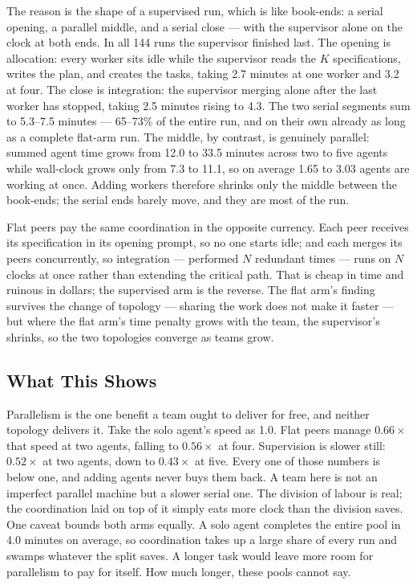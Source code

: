 \documentclass[11pt,a4paper]{article}
\begin{document}
The reason is the shape of a supervised run, which is like book-ends: a serial opening, a parallel middle, and a serial close --- with the supervisor alone on the clock at both ends. In all 144 runs the supervisor finished last. The opening is allocation: every worker sits idle while the supervisor reads the $K$ specifications, writes the plan, and creates the tasks, taking 2.7 minutes at one worker and 3.2 at four. The close is integration: the supervisor merging alone after the last worker has stopped, taking 2.5 minutes rising to 4.3. The two serial segments sum to 5.3--7.5 minutes --- 65--73\% of the entire run, and on their own already as long as a complete flat-arm run. The middle, by contrast, is genuinely parallel: summed agent time grows from 12.0 to 33.5 minutes across two to five agents while wall-clock grows only from 7.3 to 11.1, so on average 1.65 to 3.03 agents are working at once. Adding workers therefore shrinks only the middle between the book-ends; the serial ends barely move, and they are most of the run.

Flat peers pay the same coordination in the opposite currency. Each peer receives its specification in its opening prompt, so no one starts idle; and each merges its peers concurrently, so integration --- performed $N$ redundant times --- runs on $N$ clocks at once rather than extending the critical path. That is cheap in time and ruinous in dollars; the supervised arm is the reverse. The flat arm's finding survives the change of topology --- sharing the work does not make it faster --- but where the flat arm's time penalty grows with the team, the supervisor's shrinks, so the two topologies converge as teams grow.

\subsection{What This Shows}\label{sec:wallshows}

Parallelism is the one benefit a team ought to deliver for free, and neither topology delivers it. Take the solo agent's speed as 1.0. Flat peers manage $0.66\times$ that speed at two agents, falling to $0.56\times$ at four. Supervision is slower still: $0.52\times$ at two agents, down to $0.43\times$ at five. Every one of those numbers is below one, and adding agents never buys them back. A team here is not an imperfect parallel machine but a slower serial one. The division of labour is real; the coordination laid on top of it simply eats more clock than the division saves. One caveat bounds both arms equally. A solo agent completes the entire pool in 4.0 minutes on average, so coordination takes up a large share of every run and swamps whatever the split saves. A longer task would leave more room for parallelism to pay for itself. How much longer, these pools cannot say.
\end{document}
